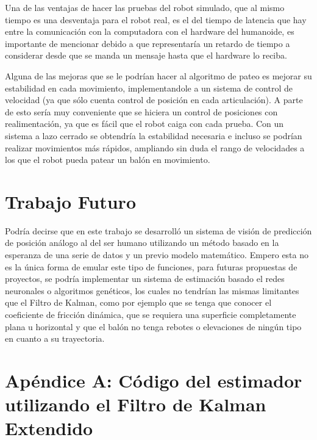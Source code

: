 	Una de las ventajas de hacer las pruebas del robot simulado, que al mismo tiempo es una desventaja para el robot real, es el del tiempo de latencia que hay entre la comunicación con la computadora con el hardware del humanoide, es importante de mencionar debido a que representaría un retardo de tiempo a considerar desde que se manda un mensaje hasta que el hardware lo reciba. 
	
	Alguna de las mejoras que se le podrían hacer al algoritmo de pateo es mejorar su estabilidad en cada movimiento, implementandole a un sistema de control de velocidad (ya que sólo cuenta control de posición en cada articulación). A parte de esto sería muy conveniente que se hiciera un control de posiciones con realimentación, ya que es fácil que el robot caiga con cada prueba. Con un sistema a lazo cerrado se obtendría la estabilidad necesaria e incluso se podrían realizar movimientos más rápidos, ampliando sin duda el rango de velocidades a los que el robot pueda patear un balón en movimiento. 
\section{Trabajo Futuro}
	Podría decirse que en este trabajo se desarrolló un sistema de visión de predicción de posición análogo al del ser humano utilizando un método basado en la esperanza de una serie de datos y un previo modelo matemático. Empero esta no es la única forma de emular este tipo de funciones, para futuras propuestas de proyectos, se podría implementar un sistema de estimación basado el redes neuronales o algoritmos genéticos, los cuales no tendrían las mismas limitantes que el Filtro de Kalman, como por ejemplo que se tenga que conocer el coeficiente de fricción dinámica, que se requiera una superficie completamente plana u horizontal y que el balón no tenga rebotes o elevaciones de ningún tipo en cuanto a su trayectoria.

\appendix
\section{Apéndice A: Código del estimador utilizando el Filtro de Kalman Extendido}
